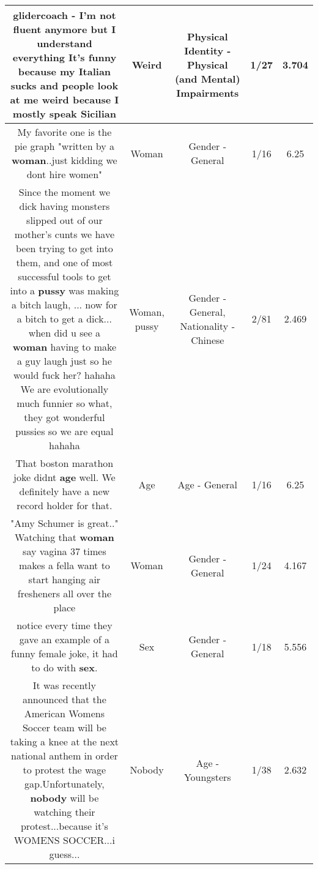 \documentclass[11pt]{article}
\newlength\mylength
\begin{document}
\begin{center}
\begin{longtable}{|C{.65\mylength}|C{.30\mylength}|C{.12\mylength}|C{.12\mylength}|C{.12\mylength}|}
  \small glidercoach - I'm not fluent anymore but I understand everything It's funny because my Italian sucks and people look at me \textbf{weird} because I mostly speak Sicilian\normalsize   & Weird & Physical Identity - Physical (and Mental) Impairments & 1/27 & 3.704 \\  \hline
  \small My favorite one is the pie graph "written by a \textbf{woman}..just kidding we dont hire women"\normalsize   & Woman & Gender - General & 1/16 & 6.25 \\  \hline
  \small Since the moment we dick having monsters slipped out of our mother's cunts we have been trying to get into them, and one of most successful tools to get into a \textbf{pussy} was making a bitch laugh, ... now for a bitch to get a dick... when did u see a \textbf{woman} having to make a guy laugh just so he would fuck her? hahaha We are evolutionally much funnier so what, they got wonderful pussies so we are equal hahaha\normalsize   & Woman, pussy & Gender - General, Nationality - Chinese & 2/81 & 2.469 \\  \hline
  \small That boston marathon joke didnt \textbf{age} well. We definitely have a new record holder for that.\normalsize   & Age & Age - General & 1/16 & 6.25 \\  \hline
  \small "Amy Schumer is great.." Watching that \textbf{woman} say vagina 37 times makes a fella want to start hanging air fresheners all over the place\normalsize   & Woman & Gender - General & 1/24 & 4.167 \\  \hline
  \small notice every time they gave an example of a funny female joke, it had to do with \textbf{sex}.\normalsize   & Sex & Gender - General & 1/18 & 5.556 \\  \hline
  \small It was recently announced that the American Womens Soccer team will be taking a knee at the next national anthem in order to protest the wage gap.Unfortunately, \textbf{nobody} will be watching their protest...because it's WOMENS SOCCER...i guess...\normalsize   & Nobody & Age - Youngsters & 1/38 & 2.632 \\  \hline

\end{longtable}
\end{center}
\end{document}
